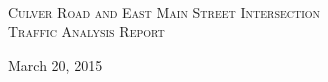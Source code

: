 \begin{titlepage}

\begin{center}

~\\[4cm]

\textsc{\Large Culver Road and East Main Street Intersection}\\[1.5cm]
\textsc{\huge Traffic Analysis Report}\\[8.5cm]



\vfill

{ March 20, 2015}

\end{center}
\end{titlepage}